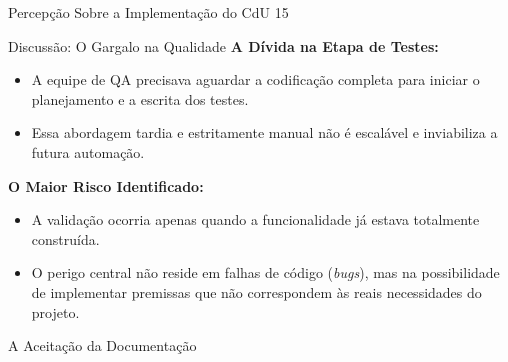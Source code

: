 \begin{frame}{Percepção Sobre a Implementação do CdU 15}
    
\end{frame}

\begin{frame}{Discussão: O Gargalo na Qualidade}
  \textbf{A Dívida na Etapa de Testes:}
  \begin{itemize}
    \item A equipe de QA precisava aguardar a codificação completa para iniciar o planejamento e a escrita dos testes.
    \item Essa abordagem tardia e estritamente manual não é escalável e inviabiliza a futura automação.
  \end{itemize}

  \vspace{1em}
  
  \textbf{O Maior Risco Identificado:}
  \begin{itemize}
    \item A validação ocorria apenas quando a funcionalidade já estava totalmente construída.
    \item O perigo central não reside em falhas de código (\textit{bugs}), mas na possibilidade de implementar premissas que não correspondem às reais necessidades do projeto.
  \end{itemize}
\end{frame}

\begin{frame}{A Aceitação da Documentação}
    
\end{frame}


